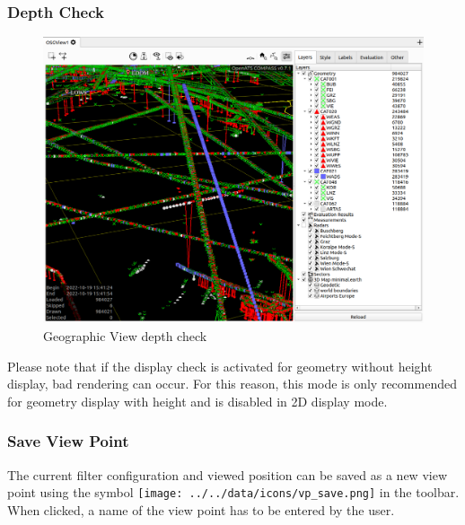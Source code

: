 \subsubsection{Depth Check}


\begin{figure}[H]
    \hspace*{-2cm}
    \includegraphics[width=18cm,frame]{figures/geoview_depth_check.png}
  \caption{Geographic View depth check}
\end{figure}

Please note that if the display check is activated for geometry without height display, bad rendering can occur. For this reason, this mode is only recommended for geometry display with height and is disabled in 2D display mode.

\subsubsection{Save View Point}

The current filter configuration and viewed position can be saved as a new view point using the symbol \texttt{[image: ../../data/icons/vp\_save.png]} in the toolbar. When clicked, a name of the view point has to be entered by the user. 

%
%
%
%
%

